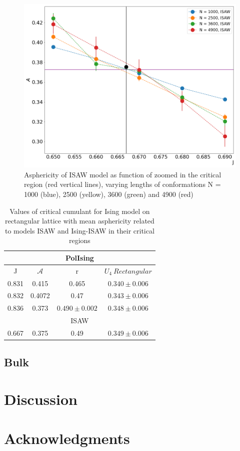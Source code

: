 \documentclass[aps,pre,amssymb,amsmath,twocolumn,floatfix]{revtex4-2}
\begin{document}
\begin{figure}[h]
    \centering
    \includegraphics[width=\columnwidth]{Images/ISAW_A_J_Close.png}
    \caption{Asphericity of ISAW model as function of zoomed in the critical region (red vertical lines), varying lengths of conformations N = 1000 (blue), 2500 (yellow), 3600 (green) and 4900 (red)}
    \label{fig:ISAW_A_J}
\end{figure}

\begin{table}[h!]
    \centering
    \begin{tabular}{|c|c|c|c|}
        \hline
         \multicolumn{4}{|c|}{PolIsing}  \\ \hline
         J & $\mathcal{A}$ & r & $U_{4}\  Rectangular$ \\ \hline
         0.831 & 0.415 & 0.465 & $0.340 \pm 0.006$\\ \hline
         0.832 & 0.4072 & 0.47 & $0.343 \pm 0.006$\\ \hline
         0.836 & 0.373 & $0.490 \pm 0.002$ & $0.348 \pm 0.006$\\ \hline
         \multicolumn{4}{|c|}{ISAW} \\ \hline
         0.667 & 0.375 & 0.49 & $0.349 \pm 0.006$ \\ \hline
    \end{tabular}
    \caption{Values of critical cumulant for Ising model on rectangular lattice with mean asphericity related to models ISAW and Ising-ISAW in their critical regions}
    \label{tab:A_r_U}
\end{table}

\subsection{Bulk}

\section{Discussion}

\section{Acknowledgments}


\end{document}

